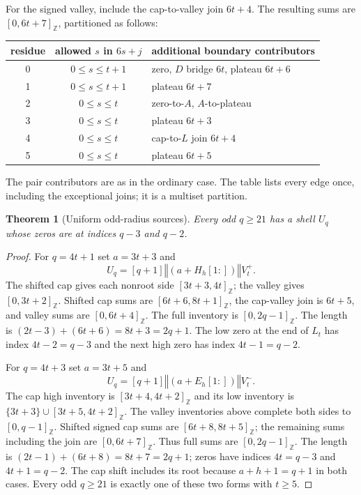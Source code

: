 \documentclass[11pt,a4paper]{article}
\newtheorem{theorem}{Theorem}[section]
\theoremstyle{definition}\newtheorem{definition}[theorem]{Definition}
\theoremstyle{remark}\newtheorem{remark}[theorem]{Remark}
\newcommand{\cat}{\mathbin{\Vert}}
\newcommand{\ints}[2]{[#1,#2]_{\mathbb Z}}
\begin{document}
For the signed valley, include the cap-to-valley join $6t+4$.
The resulting sums are $\ints0{6t+7}$, partitioned as follows:
\begin{center}\begin{tabular}{c c l}\toprule
 residue & allowed $s$ in $6s+j$ & additional boundary contributors\\\midrule
0 & $0\le s\le t+1$ & zero, $D$ bridge $6t$, plateau $6t+6$\\
1 & $0\le s\le t+1$ & plateau $6t+7$\\
2 & $0\le s\le t$ & zero-to-$A$, $A$-to-plateau\\
3 & $0\le s\le t$ & plateau $6t+3$\\
4 & $0\le s\le t$ & cap-to-$L$ join $6t+4$\\
5 & $0\le s\le t$ & plateau $6t+5$\\\bottomrule
\end{tabular}\end{center}
The pair contributors are as in the ordinary case. The table lists every
edge once, including the exceptional joins; it is a multiset partition.

\begin{theorem}[Uniform odd-radius sources]\label{thm:source}
Every odd $q\ge21$ has a shell $U_q$ whose zeros are at indices
$q-3$ and $q-2$.
\end{theorem}
\begin{proof}
For $q=4t+1$ set $a=3t+3$ and
\[
 U_q=[q+1]\cat(a+H_h[1:])\cat V_t^+.
\]
The shifted cap gives each nonroot side $\ints{3t+3}{4t}$; the valley
gives $\ints0{3t+2}$. Shifted cap sums are
$\ints{6t+6}{8t+1}$, the cap-valley join is $6t+5$, and valley sums
are $\ints0{6t+4}$. The full inventory is $\ints0{2q-1}$.
The length is $(2t-3)+(6t+6)=8t+3=2q+1$.
The low zero at the end of $L_t$ has index $4t-2=q-3$ and the next
high zero has index $4t-1=q-2$.

For $q=4t+3$ set $a=3t+5$ and
\[
 U_q=[q+1]\cat(a+E_h[1:])\cat V_t^-.
\]
The cap high inventory is $\ints{3t+4}{4t+2}$ and its low inventory
is $\{3t+3\}\cup\ints{3t+5}{4t+2}$. The valley inventories above
complete both sides to $\ints0{q-1}$. Shifted signed cap sums are
$\ints{6t+8}{8t+5}$; the remaining sums including the join are
$\ints0{6t+7}$. Thus full sums are $\ints0{2q-1}$.
The length is $(2t-1)+(6t+8)=8t+7=2q+1$; zeros have indices
$4t=q-3$ and $4t+1=q-2$. The cap shift includes its root because
$a+h+1=q+1$ in both cases. Every odd $q\ge21$ is exactly one of
these two forms with $t\ge5$.
\end{proof}
\end{document}
